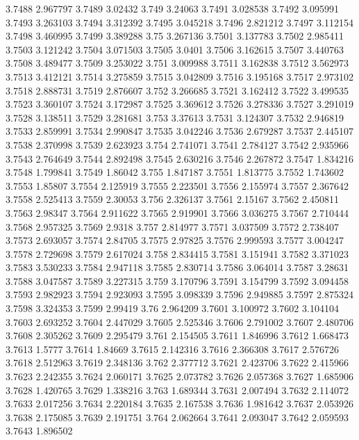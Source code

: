 3.7488  2.967797
3.7489  3.02432
3.749  3.24063
3.7491  3.028538
3.7492  3.095991
3.7493  3.263103
3.7494  3.312392
3.7495  3.045218
3.7496  2.821212
3.7497  3.112154
3.7498  3.460995
3.7499  3.389288
3.75  3.267136
3.7501  3.137783
3.7502  2.985411
3.7503  3.121242
3.7504  3.071503
3.7505  3.0401
3.7506  3.162615
3.7507  3.440763
3.7508  3.489477
3.7509  3.253022
3.751  3.009988
3.7511  3.162838
3.7512  3.562973
3.7513  3.412121
3.7514  3.275859
3.7515  3.042809
3.7516  3.195168
3.7517  2.973102
3.7518  2.888731
3.7519  2.876607
3.752  3.266685
3.7521  3.162412
3.7522  3.499535
3.7523  3.360107
3.7524  3.172987
3.7525  3.369612
3.7526  3.278336
3.7527  3.291019
3.7528  3.138511
3.7529  3.281681
3.753  3.37613
3.7531  3.124307
3.7532  2.946819
3.7533  2.859991
3.7534  2.990847
3.7535  3.042246
3.7536  2.679287
3.7537  2.445107
3.7538  2.370998
3.7539  2.623923
3.754  2.741071
3.7541  2.784127
3.7542  2.935966
3.7543  2.764649
3.7544  2.892498
3.7545  2.630216
3.7546  2.267872
3.7547  1.834216
3.7548  1.799841
3.7549  1.86042
3.755  1.847187
3.7551  1.813775
3.7552  1.743602
3.7553  1.85807
3.7554  2.125919
3.7555  2.223501
3.7556  2.155974
3.7557  2.367642
3.7558  2.525413
3.7559  2.30053
3.756  2.326137
3.7561  2.15167
3.7562  2.450811
3.7563  2.98347
3.7564  2.911622
3.7565  2.919901
3.7566  3.036275
3.7567  2.710444
3.7568  2.957325
3.7569  2.9318
3.757  2.814977
3.7571  3.037509
3.7572  2.738407
3.7573  2.693057
3.7574  2.84705
3.7575  2.97825
3.7576  2.999593
3.7577  3.004247
3.7578  2.729698
3.7579  2.617024
3.758  2.834415
3.7581  3.151941
3.7582  3.371023
3.7583  3.530233
3.7584  2.947118
3.7585  2.830714
3.7586  3.064014
3.7587  3.28631
3.7588  3.047587
3.7589  3.227315
3.759  3.170796
3.7591  3.154799
3.7592  3.094458
3.7593  2.982923
3.7594  2.923093
3.7595  3.098339
3.7596  2.949885
3.7597  2.875324
3.7598  3.324353
3.7599  2.99419
3.76  2.964209
3.7601  3.100972
3.7602  3.104104
3.7603  2.693252
3.7604  2.447029
3.7605  2.525346
3.7606  2.791002
3.7607  2.480706
3.7608  2.305262
3.7609  2.295479
3.761  2.154505
3.7611  1.846996
3.7612  1.668473
3.7613  1.5777
3.7614  1.84669
3.7615  2.142316
3.7616  2.366308
3.7617  2.576726
3.7618  2.512963
3.7619  2.348136
3.762  2.377712
3.7621  2.423706
3.7622  2.415966
3.7623  2.242355
3.7624  2.060171
3.7625  2.073782
3.7626  2.057368
3.7627  1.685906
3.7628  1.420765
3.7629  1.338216
3.763  1.689344
3.7631  2.007494
3.7632  2.114072
3.7633  2.017256
3.7634  2.220184
3.7635  2.167538
3.7636  1.981642
3.7637  2.053926
3.7638  2.175085
3.7639  2.191751
3.764  2.062664
3.7641  2.093047
3.7642  2.059593
3.7643  1.896502
